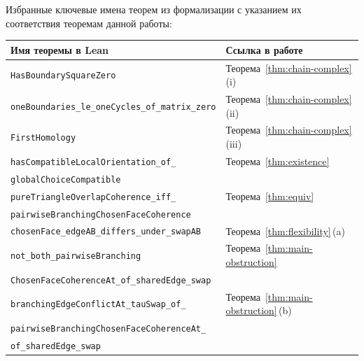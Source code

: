 \documentclass[11pt,a4paper]{article}
\theoremstyle{plain}
\theoremstyle{definition}
\theoremstyle{remark}
\begin{document}
\medskip

Избранные ключевые имена теорем из формализации с указанием их
соответствия теоремам данной работы:

\medskip
\begin{center}
\small
\begin{tabular}{ll}
\toprule
\textbf{Имя теоремы в Lean} & \textbf{Ссылка в работе} \\
\midrule
\texttt{HasBoundarySquareZero} &
  Теорема~\ref{thm:chain-complex}\,(i) \\
\texttt{oneBoundaries\_le\_oneCycles\_of\_matrix\_zero} &
  Теорема~\ref{thm:chain-complex}\,(ii) \\
\texttt{FirstHomology} &
  Теорема~\ref{thm:chain-complex}\,(iii) \\
\texttt{hasCompatibleLocalOrientation\_of\_} &
  Теорема~\ref{thm:existence} \\
\quad\texttt{globalChoiceCompatible} & \\
\texttt{pureTriangleOverlapCoherence\_iff\_} &
  Теорема~\ref{thm:equiv} \\
\quad\texttt{pairwiseBranchingChosenFaceCoherence} & \\
\texttt{chosenFace\_edgeAB\_differs\_under\_swapAB} &
  Теорема~\ref{thm:flexibility}\,(a) \\
\texttt{not\_both\_pairwiseBranching} &
  Теорема~\ref{thm:main-obstruction} \\
\quad\texttt{ChosenFaceCoherenceAt\_of\_sharedEdge\_swap} & \\
\texttt{branchingEdgeConflictAt\_tauSwap\_of\_} &
  Теорема~\ref{thm:main-obstruction}\,(b) \\
\quad\texttt{pairwiseBranchingChosenFaceCoherenceAt\_} & \\
\quad\texttt{of\_sharedEdge\_swap} & \\
\bottomrule
\end{tabular}
\end{center}
\end{document}
